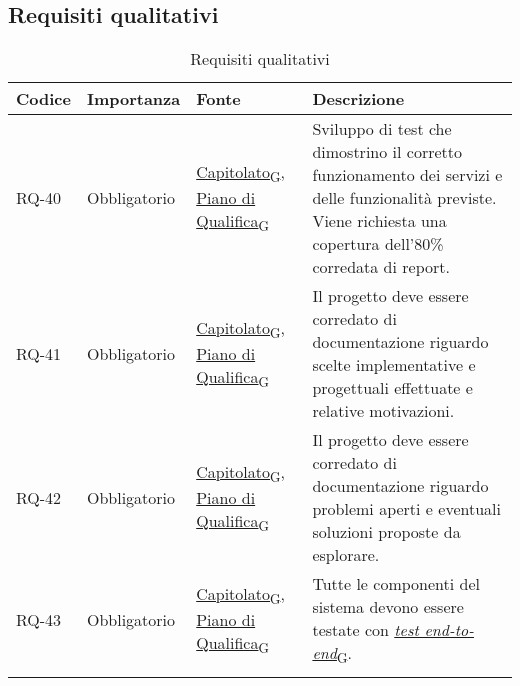 \subsection{Requisiti qualitativi}
\begin{longtable}{|>{\centering\arraybackslash}m{}|>{\centering\arraybackslash}m{}|>{\centering\arraybackslash}m{}|>{\centering\arraybackslash}m{}|}
	\hline
	\textbf{Codice} & \textbf{Importanza} & \textbf{Fonte} & \textbf{Descrizione}
	\\\hline
	\endfirsthead
	RQ-40			& Obbligatorio        & \href{https://7last.github.io/docs/rtb/documentazione-interna/glossario\#capitolato}{Capitolato\textsubscript{G}}, \href{https://7last.github.io/docs/rtb/documentazione-interna/glossario\#piano-di-qualifica}{Piano di Qualifica\textsubscript{G}} & Sviluppo di test che dimostrino il corretto funzionamento dei servizi e delle funzionalità previste. Viene richiesta una copertura dell'80\% corredata di report.
	\\\hline
	RQ-41           & Obbligatorio        & \href{https://7last.github.io/docs/rtb/documentazione-interna/glossario\#capitolato}{Capitolato\textsubscript{G}}, \href{https://7last.github.io/docs/rtb/documentazione-interna/glossario\#piano-di-qualifica}{Piano di Qualifica\textsubscript{G}} & Il progetto deve essere corredato di documentazione riguardo scelte implementative e progettuali effettuate e relative motivazioni.
	\\\hline
	RQ-42           & Obbligatorio        & \href{https://7last.github.io/docs/rtb/documentazione-interna/glossario\#capitolato}{Capitolato\textsubscript{G}}, \href{https://7last.github.io/docs/rtb/documentazione-interna/glossario\#piano-di-qualifica}{Piano di Qualifica\textsubscript{G}} & Il progetto deve essere corredato di documentazione riguardo problemi aperti e eventuali soluzioni proposte da esplorare.
	\\\hline
	RQ-43           & Obbligatorio        & \href{https://7last.github.io/docs/rtb/documentazione-interna/glossario\#capitolato}{Capitolato\textsubscript{G}}, \href{https://7last.github.io/docs/rtb/documentazione-interna/glossario\#piano-di-qualifica}{Piano di Qualifica\textsubscript{G}} & Tutte le componenti del sistema devono essere testate con \href{https://7last.github.io/docs/rtb/documentazione-interna/glossario\#test-end-to-end}{\textit{test end-to-end}\textsubscript{G}}. \\\hline
	\caption{Requisiti qualitativi}
\end{longtable}

